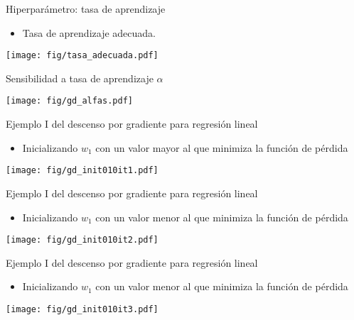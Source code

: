 \documentclass[aspectratio=169,9pt]{beamer}
\begin{document}
\begin{frame}{Hiperparámetro: tasa de aprendizaje}
	\begin{itemize}
		\item Tasa de aprendizaje adecuada.
	\end{itemize}
	\begin{center}
		\texttt{[image: fig/tasa\_adecuada.pdf]}
	\end{center}
\end{frame}




\begin{frame}{Sensibilidad a tasa de aprendizaje $\alpha$}
	\begin{center}
		\texttt{[image: fig/gd\_alfas.pdf]}
	\end{center}
\end{frame}

\begin{frame}{Ejemplo I del descenso por gradiente para regresión lineal}	
\begin{itemize}
	\item Inicializando $w_1$ con un valor mayor al que minimiza la función de pérdida 
\end{itemize}	
	\begin{center}
	\texttt{[image: fig/gd\_init010it1.pdf]}
	\end{center}
\end{frame}


\begin{frame}{Ejemplo I del descenso por gradiente para regresión lineal}
\begin{itemize}
	\item Inicializando $w_1$ con un valor menor al que minimiza la función de pérdida
\end{itemize}	
	\begin{center}
		\texttt{[image: fig/gd\_init010it2.pdf]}
	\end{center}
\end{frame}

\begin{frame}{Ejemplo I del descenso por gradiente para regresión lineal}
\begin{itemize}
	\item Inicializando $w_1$ con un valor menor al que minimiza la función de pérdida
\end{itemize}	
	\begin{center}
		\texttt{[image: fig/gd\_init010it3.pdf]}
	\end{center}
\end{frame}
\end{document}
